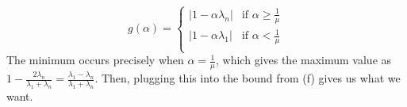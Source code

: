 \documentclass{article}
\begin{document}
\[
    g(\alpha)=\begin{cases}
        |1-\alpha\lambda_n|&\text{if }\alpha\geq\frac{1}{\mu}\\
        |1-\alpha\lambda_1|&\text{if }\alpha<\frac{1}{\mu}\\
    \end{cases}
\]
The minimum occurs precisely when $\alpha=\frac{1}{\mu}$, which gives the maximum value as $1-\frac{2\lambda_n}{\lambda_1+\lambda_n}=\frac{\lambda_1-\lambda_n}{\lambda_1+\lambda_n}$. Then, plugging this into the bound from (f) gives us what we want.
\end{document}
